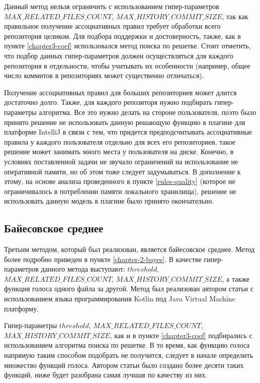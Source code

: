 Данный метод нельзя ограничить с использованием гипер-параметров $MAX\_RELATED\_FILES\_COUNT$, $MAX\_HISTORY\_COMMIT\_SIZE$, так как правильное получение ассоциативных правил требует обработки всего репозитория целиком. Для подбора поддержки и достоверность, также, как в пункте \ref{chapter3-coef} использовался метод поиска по решетке. Стоит отметить, что подбор данных гипер-параметров должен осуществляться для каждого репозитория в отдельности, чтобы учитывать их особенности (например, общее число коммитов в репозиториях может существенно отличаться).

Получение ассоциативных правил для больших репозиториев может длится достаточно долго. Также, для каждого репозиторя нужно подбирать гипер-параметры алгоритма. Все это нужно делать на стороне пользователя, поэто было принято решение не использовать данную решающую функцию в плагине для платформе IntelliJ в связи с тем, что придется предподсчитывать ассоциативные правила у каждого пользователя отдельно для всех его репозиториев, такое решение может занимать много места у пользователя на диске. Конечно, в условиях поставленной задачи не звучало ограничений на использование не оперативной памяти, но об этом тоже следует задумываться. В дополнение к этому, на основе анализа проведенного в пункте \ref{rules-quality} (которое не ограничивалось в потреблении памяти локального хранилища), решение не использовать данную модель в плагине было принято окончательно.

    \subsection{Байесовское среднее}\label{chapter3-bayes}
Третьим методом, который был реализован, является байесовское среднее. Метод более подробно приведен в пункте \ref{chapter-2-bayes}. В качестве гипер-параметров данного метода выступают: $threshold$, $MAX\_RELATED\_FILES\_COUNT$, $MAX\_HISTORY\_COMMIT\_SIZE$, а также функция голоса одного файла за другой. Метод был реализован автором статьи с использованием языка программирования Kotlin под Java Virtual Machine платформу.

Гипер-параметры $threshold$, $MAX\_RELATED\_FILES\_COUNT$, $MAX\_HISTORY\_COMMIT\_SIZE$, как и в пункте \ref{chapter3-coef} подбирались с использованием алгоритма поиска по решетке. В то время, как функцию голоса напрямую таким способом подобрать не получится, следует в начале определить множество функций голоса. Автором статьи было создано более десяти таких функций, ниже будет разобрана самая лучшая по качеству из них.

